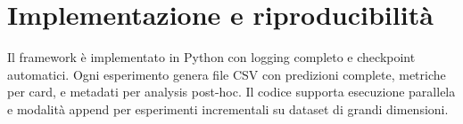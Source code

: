 \section{Implementazione e riproducibilità}

Il framework è implementato in Python con logging completo e checkpoint automatici. Ogni esperimento genera file CSV con predizioni complete, metriche per card, e metadati per analysis post-hoc. Il codice supporta esecuzione parallela e modalità append per esperimenti incrementali su dataset di grandi dimensioni.